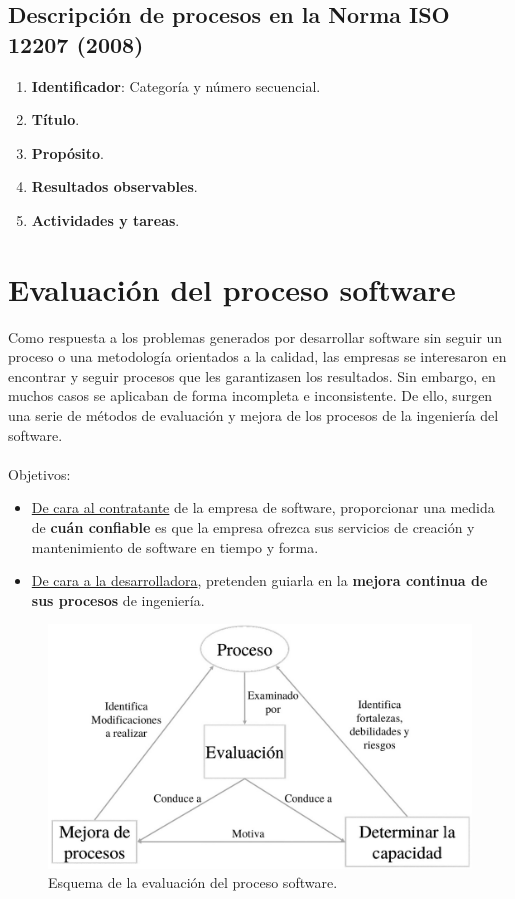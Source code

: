 \subsection{Descripción de procesos en la Norma ISO 12207 (2008)}

\begin{enumerate}
    \item \textbf{Identificador}: Categoría y número secuencial.
    \item \textbf{Título}.
    \item \textbf{Propósito}.
    \item \textbf{Resultados observables}.
    \item \textbf{Actividades y tareas}.
\end{enumerate}


\section{Evaluación del proceso software}
Como respuesta a los problemas generados por desarrollar software sin seguir un proceso o una metodología orientados a la calidad, las empresas se interesaron en encontrar y seguir procesos que les garantizasen los resultados. Sin embargo, en muchos casos se aplicaban de forma incompleta e inconsistente. De ello, surgen una serie de métodos de evaluación y mejora de los procesos de la ingeniería del software.
\\\\
Objetivos:
\begin{itemize}
    \item \uline{De cara al contratante} de la empresa de software, proporcionar una medida de \textbf{cuán confiable} es que la empresa ofrezca sus servicios de creación y mantenimiento de software en tiempo y forma.
    \item \uline{De cara a la desarrolladora}, pretenden guiarla en la \textbf{mejora continua de sus procesos} de ingeniería.
\end{itemize}

\begin{figure}[H]
    \centering
    \includegraphics[width=0.6\linewidth]{Resources/evaluacionSoftware}
    \caption{Esquema de la evaluación del proceso software.}
    \label{fig:evaluacionSoftware}
\end{figure}

